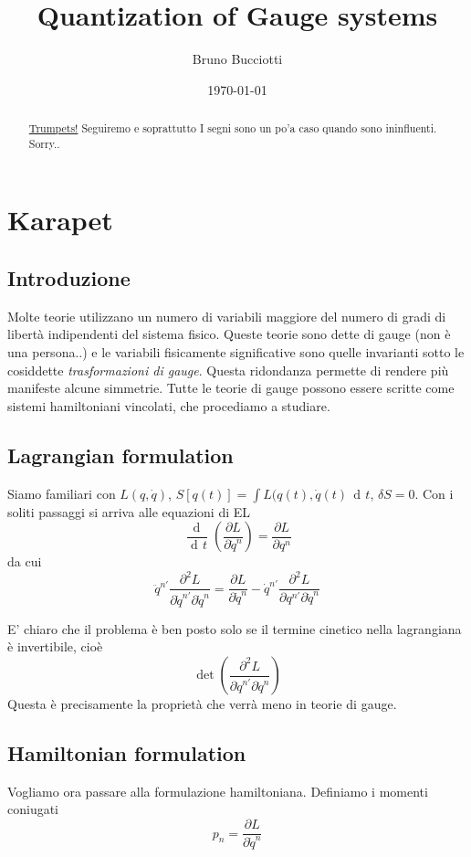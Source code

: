 \documentclass[a4paper, 11pt]{article}
\date{\today}
\author{Bruno Bucciotti}
\title{Quantization of Gauge systems}
\newcommand{\dd}{\mathop{\mathrm{d}\!}{}}
\newcommand{\deriv}[2]{\dfrac{\dd #1}{\dd #2}}
\newcommand{\pderiv}[2]{\dfrac{\partial #1}{\partial #2}}
\begin{document}
	\maketitle
	
	\begin{abstract}
		\href{https://www.youtube.com/watch?v=IwInqrN_auU}{Trumpets!}
		Seguiremo \cite{dirac} e soprattutto \cite{HT}
		I segni sono un po'a caso quando sono ininfluenti. Sorry..
		
	\end{abstract}

	\tableofcontents
	\clearpage
	\section{Karapet}
	\subsection{Introduzione}
	Molte teorie utilizzano un numero di variabili maggiore del numero di gradi di libertà indipendenti del sistema fisico.
	Queste teorie sono dette di gauge (non è una persona..) e le variabili fisicamente significative sono quelle invarianti sotto le cosiddette \emph{trasformazioni di gauge}. Questa ridondanza permette di rendere più manifeste alcune simmetrie. Tutte le teorie di gauge possono essere scritte come sistemi hamiltoniani vincolati, che procediamo a studiare.
	
	\subsection{Lagrangian formulation}
	Siamo familiari con $L(q,\dot{q})$, $S[q(t)] = \int L(q(t), \dot{q}(t)\, \dd t$, $\delta S=0$. Con i soliti passaggi si arriva alle equazioni di EL
	\[ \deriv{}{t} \left( \pderiv{L}{\dot{q}^n} \right) = \pderiv{L}{q^n} \]
	da cui
	\[ \ddot{q}^{n'} \pderiv{^2 L}{\dot{q}^{n'}\partial\dot{q}^n} = \pderiv{L}{\dot{q}^n} - \dot{q}^{n'} \pderiv{^2 L}{q^{n'}\partial\dot{q}^n} \]
	
	E' chiaro che il problema è ben posto solo se il termine cinetico nella lagrangiana è invertibile, cioè
	\[ \det\left( \pderiv{^2L}{\dot{q}^{n'}\partial\dot{q}^{n}} \right) \]
	Questa è precisamente la proprietà che verrà meno in teorie di gauge.
	
	\subsection{Hamiltonian formulation}
	Vogliamo ora passare alla formulazione hamiltoniana. Definiamo i momenti coniugati
	\[ p_n = \pderiv{L}{\dot{q}^{n}} \]
	
\end{document}
